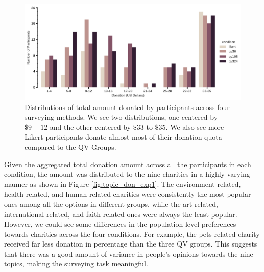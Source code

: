\begin{figure}[htpb]
    \centering
    \includegraphics[width=\textwidth, keepaspectratio=true]{content/image/total_contributions_across_conditions.pdf}
    \caption{
       Distributions of total amount donated by participants across four surveying methods.
       We see two distributions, one centered by $\$9-12$ and the other centered by $\$33$ to $\$35$.
       We also see more Likert participants donate almost most of their donation quota compared to the QV Groups.
    }
    \label{fig:total_don_exp1}
\end{figure}

Given the aggregated total donation amount across all the participants in each condition, the amount was distributed to the nine charities in a highly varying manner as shown in Figure \ref{fig:topic_don_exp1}. The environment-related, health-related, and human-related charities were consistently the most popular ones among all the options in different groups, while the art-related, international-related, and faith-related ones were always the least popular. However, we could see some differences in the population-level preferences towards charities across the four conditions. For example, the pets-related charity received far less donation in percentage than the three QV groups. This suggests that there was a good amount of variance in people's opinions towards the nine topics, making the surveying task meaningful.

